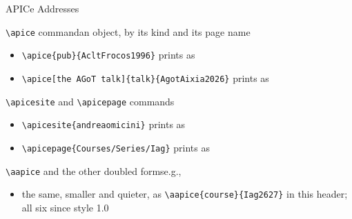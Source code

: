 \begin{frame}[c,fragile]{APICe Addresses}
%
\begin{block}{\texttt{\textbackslash{}apice} command\textemdash{}an object, by its kind and its page name}
\begin{itemize}
	\item[e.g.] \verb|| prints as \apice{pub}{AcltFrocos1996}
	\item[e.g.] \verb|| prints as \apice[the AGoT talk]{talk}{AgotAixia2026}
\end{itemize}
\end{block}
%
\begin{block}{\texttt{\textbackslash{}apicesite} and \texttt{\textbackslash{}apicepage} commands}
\begin{itemize}
	\item[e.g.] \verb|| prints as \apicesite{andreaomicini}
	\item[e.g.] \verb|| prints as \apicepage{Courses/Series/Iag}
\end{itemize}
\end{block}
%
\begin{block}{\texttt{\textbackslash{}aapice} and the other doubled forms\textemdash{}e.g., }
\begin{itemize}
	\item the same, smaller and quieter, as \verb|\aapice{course}{Iag2627}| in this header; all six since style 1.0
\end{itemize}
\end{block}
%
\end{frame}
